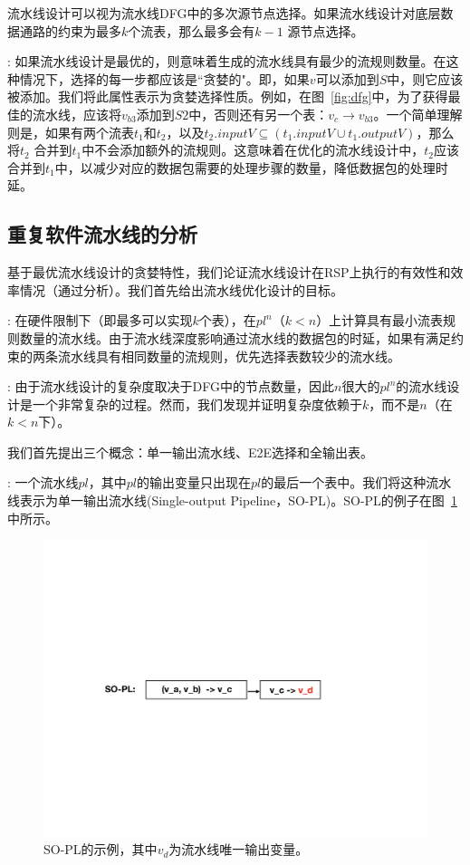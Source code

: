 流水线设计可以视为流水线DFG中的多次源节点选择。如果流水线设计对底层数据通路的约束为最多$k$个流表，那么最多会有$k-1$ 源节点选择。

: 如果流水线设计是最优的，则意味着生成的流水线具有最少的流规则数量。在这种情况下，选择的每一步都应该是``贪婪的"。即，如果$v$可以添加到$S$中，则它应该被添加。我们将此属性表示为贪婪选择性质。例如，在图~\ref{fig:dfg}中，为了获得最佳的流水线，应该将$v_{b3}$添加到$S2$中，否则还有另一个表：$v_c \rightarrow v_{b3}$。一个简单理解则是，如果有两个流表$t_1$和$t_2$，以及$t_2.inputV \subseteq (t_1.inputV \cup t_1.outputV)$，那么将$t_2$ 合并到$t_1$中不会添加额外的流规则。这意味着在优化的流水线设计中，$t_2$应该合并到$t_1$中，以减少对应的数据包需要的处理步骤的数量，降低数据包的处理时延。

\subsection{重复软件流水线的分析}
基于最优流水线设计的贪婪特性，我们论证流水线设计在RSP上执行的有效性和效率情况（通过分析）。我们首先给出流水线优化设计的目标。

: 在硬件限制下（即最多可以实现$k$个表），在$pl^n$（$k < n$）上计算具有最小流表规则数量的流水线。由于流水线深度影响通过流水线的数据包的时延，如果有满足约束的两条流水线具有相同数量的流规则，优先选择表数较少的流水线。

: 由于流水线设计的复杂度取决于DFG中的节点数量，因此$n$很大的$pl^n$的流水线设计是一个非常复杂的过程。然而，我们发现并证明复杂度依赖于$k$，而不是$n$（在$k < n$下）。

我们首先提出三个概念：单一输出流水线、E2E选择和全输出表。

: 一个流水线$pl$，其中$pl$的输出变量只出现在$pl$的最后一个表中。我们将这种流水线表示为单一输出流水线(Single-output Pipeline，SO-PL)。SO-PL的例子在图~\ref{fig:sopl}中所示。
%
\begin{figure}[!htbp]
\includegraphics[width=0.8\linewidth]{figures/lp-68.pdf}
\centering
\caption{\small SO-PL的示例，其中$v_d$为流水线唯一输出变量。}
\label{fig:sopl}
\end{figure}

